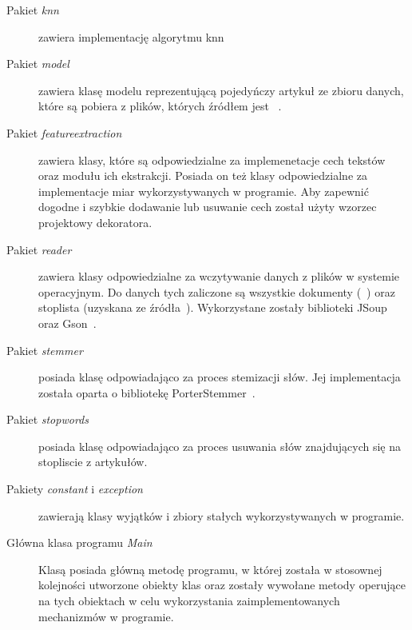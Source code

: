\documentclass{classrep}
\begin{document}
{        \begin{description}
            \item[Pakiet \emph{knn}] zawiera implementację algorytmu knn
            \item[Pakiet \emph{model}] zawiera klasę modelu reprezentującą pojedyńczy artykuł ze zbioru danych,
                które są pobiera z plików, których źródłem jest ~\cite{data}.
            \item[Pakiet \emph{featureextraction}] zawiera klasy, które są odpowiedzialne za implemenetacje cech tekstów oraz
                modułu ich ekstrakcji. Posiada on też klasy odpowiedzialne za implementacje miar
                wykorzystywanych w programie. Aby zapewnić dogodne i szybkie dodawanie lub usuwanie
                cech został użyty wzorzec projektowy dekoratora.
            \item[Pakiet \emph{reader}] zawiera klasy odpowiedzialne za wczytywanie danych z plików w systemie operacyjnym. Do
                danych tych zaliczone są wszystkie dokumenty (~\cite{data}) oraz stoplista (uzyskana ze źródła~\cite{stoplist}).
                Wykorzystane zostały biblioteki JSoup~\cite{sgmlparser} oraz Gson~\cite{gson}.
            \item[Pakiet \emph{stemmer}] posiada klasę odpowiadająco za proces stemizacji słów. Jej implementacja została
                oparta o bibliotekę PorterStemmer~\cite{stemmer}.
            \item[Pakiet \emph{stopwords}] posiada klasę odpowiadająco za proces usuwania słów znajdujących się
                na stopliscie z artykułów.
            \item[Pakiety \emph{constant} i \emph{exception}] zawierają klasy wyjątków i zbiory stałych wykorzystywanych
                w programie.
            \item[Główna klasa programu \emph{Main}] Klasą posiada główną metodę programu, w której została w stosownej kolejności
                utworzone obiekty klas oraz zostały wywołane metody operujące na tych obiektach
                w celu wykorzystania zaimplementowanych mechanizmów w programie.
        \end{description}
    }
\end{document}
